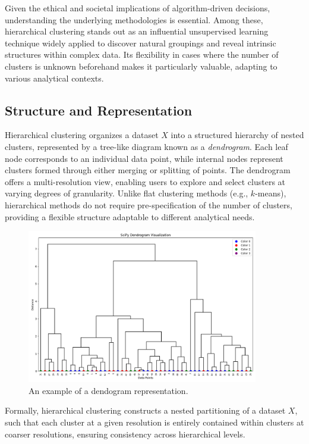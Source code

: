 Given the ethical and societal implications of algorithm-driven
decisions, understanding the underlying methodologies is essential.
Among these, hierarchical clustering stands out as an influential
unsupervised learning technique widely applied to discover natural
groupings and reveal intrinsic structures within complex data. Its
flexibility in cases where the number of clusters is unknown
beforehand makes it particularly valuable, adapting to various
analytical contexts.

\subsection{Structure and Representation}\label{subsec:hierarchical_clustering}

Hierarchical clustering organizes a dataset \(X\) into a structured
hierarchy of nested clusters, represented by a tree-like diagram
known as a \textit{dendrogram}. Each leaf node corresponds to an
individual data point, while internal nodes represent clusters formed
through either merging or splitting of points. The dendrogram offers
a multi-resolution view, enabling users to explore and select
clusters at varying degrees of granularity. Unlike flat clustering
methods (e.g., \(k\)-means), hierarchical methods do not require
pre-specification of the number of clusters, providing a flexible
structure adaptable to different analytical needs.

\begin{figure}[h]
  \centering
  \includegraphics[width=0.9\textwidth]{sections/background/scipy_dendrogram.png}
  \caption{An example of a dendogram representation.}
  \label{fig:example-dendogram}
\end{figure}

Formally, hierarchical clustering constructs a nested partitioning of
a dataset \(X\), such that each cluster at a given resolution is
entirely contained within clusters at coarser resolutions, ensuring
consistency across hierarchical levels.

